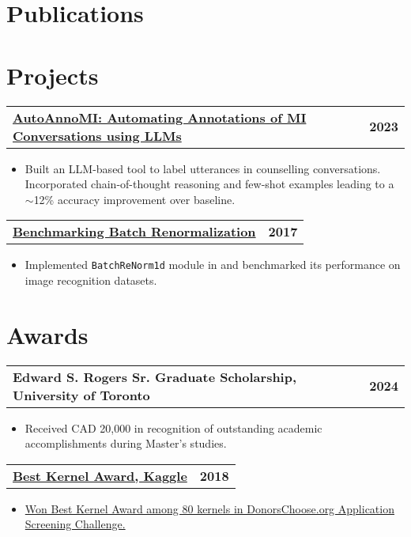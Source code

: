 \documentclass{ExpressiveResume}
\makeatletter
\newcommand{\ExternalLink}{\textbf{%
  \tikz[x=1.2ex, y=1.2ex, baseline=-0.05ex]{%
    \begin{scope}[x=1ex, y=1ex]
        \clip (-0.1,-0.1)
          --++ (-0, 1.2)
          --++ (0.6, 0)
          --++ (0, -0.6)
          --++ (0.6, 0)
          --++ (0, -1);
        \path[draw,
          line width = 1,
          rounded corners=0.75]
          (0,0) rectangle (1,1);
    \end{scope}
    \path[draw, line width = 1] (0.5, 0.5)
      -- (1, 1);
    \path[draw, line width = 1] (0.6, 1)
      -- (1, 1) -- (1, 0.6);
    }
  }}
\newcommand{\mainBullet}{\hspace{12pt}\color{blue}\fontsize{11}{13.2}\selectfont{\ding{70}}}
\newcommand{\myresumesubsection}[2]{%
    \noindent\begin{tabular*}{\linewidth}{@{}l@{\extracolsep{\fill}}r@{}}
    {\subsectionfont\bfseries #1} & {\subsectionfont\bfseries #2}\\
  \end{tabular*}\par
}
\makeatother
\begin{document}
\section{Publications}
\normaltextfont{
\printbibliography[heading=none]
}

\vspace{0.27em}

\section{Projects}

\myresumesubsection{\href{https://www.eecg.utoronto.ca/~jayar/ece1786.2023/download/autoannomi.pdf}{{\mainBullet} AutoAnnoMI: Automating Annotations of MI Conversations using LLMs \tech{\ExternalLink}}}{2023}
\begin{itemize}[leftmargin=*, label={}]
    \item Built an LLM-based tool to label utterances in counselling conversations. Incorporated chain-of-thought reasoning and few-shot examples leading to a $\sim$12\% accuracy improvement over baseline.
\end{itemize}

\myresumesubsection{\href{https://zaffnet.github.io/batch-normalization}{{\mainBullet} Benchmarking Batch Renormalization \tech{\ExternalLink}}}{2017}
\begin{itemize}[leftmargin=*, label={}]
    \item Implemented \texttt{BatchReNorm1d} module in  and benchmarked its performance on image recognition datasets.
\end{itemize}

\section{Awards}

\myresumesubsection{{\mainBullet} Edward S. Rogers Sr. Graduate Scholarship, University of Toronto}{2024}
\begin{itemize}[leftmargin=*, label={}]
    \item Received CAD 20,000 in recognition of outstanding academic accomplishments during Master's studies.
\end{itemize}

\myresumesubsection{\href{https://www.kaggle.com/c/donorschoose-application-screening/discussion/55396}{{\mainBullet} Best Kernel Award, Kaggle}}{2018}
\begin{itemize}[leftmargin=*, label={}]
    \item \href{https://www.kaggle.com/c/donorschoose-application-screening/discussion/55396}{Won Best Kernel Award among 80 kernels in DonorsChoose.org Application Screening Challenge.}
\end{itemize}

\end{document}

